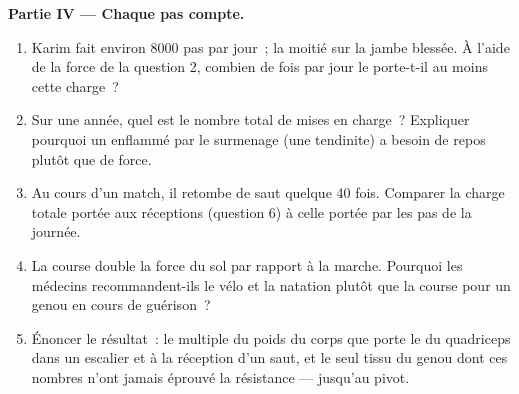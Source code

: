 \begin{problem}
\medskip
\noindent\textbf{Partie IV --- Chaque pas compte.}
\begin{enumerate}[resume]
  \item Karim fait environ 8000 pas par jour~; la moitié sur la jambe
        blessée. À l'aide de la force de la question 2, combien de fois
        par jour le  porte-t-il au moins cette charge~?
  \item Sur une année, quel est le nombre total de mises en charge~?
        Expliquer pourquoi un  enflammé par le surmenage (une
        tendinite) a besoin de repos plutôt que de force.
  \item Au cours d'un match, il retombe de saut quelque 40 fois.
        Comparer la charge totale portée aux réceptions (question 6) à
        celle portée par les pas de la journée.
  \item La course double la force du sol par rapport à la marche.
        Pourquoi les médecins recommandent-ils le vélo et la natation
        plutôt que la course pour un genou en cours de guérison~?
  \item Énoncer le résultat~: le multiple du poids du corps que porte
        le  du quadriceps dans un escalier et à la réception d'un
        saut, et le seul tissu du genou dont ces nombres n'ont jamais
        éprouvé la résistance --- jusqu'au pivot.
\end{enumerate}
\end{problem}
